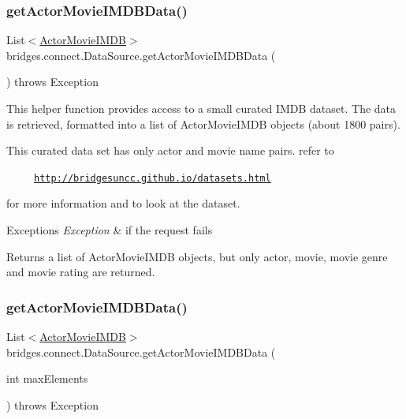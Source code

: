 \subsubsection{\texorpdfstring{get\+Actor\+Movie\+I\+M\+D\+B\+Data()}{getActorMovieIMDBData()}\hspace{0.1cm}{\footnotesize\ttfamily [1/2]}}
{\footnotesize\ttfamily List$<$\hyperlink{classbridges_1_1data__src__dependent_1_1_actor_movie_i_m_d_b}{Actor\+Movie\+I\+M\+DB}$>$ bridges.\+connect.\+Data\+Source.\+get\+Actor\+Movie\+I\+M\+D\+B\+Data (\begin{DoxyParamCaption}{ }\end{DoxyParamCaption}) throws Exception}

This helper function provides access to a small curated I\+M\+DB dataset. The data is retrieved, formatted into a list of Actor\+Movie\+I\+M\+DB objects (about 1800 pairs).

This curated data set has only actor and movie name pairs. refer to 

~~~~~\href{http://bridgesuncc.github.io/datasets.html}{\tt http\+://bridgesuncc.\+github.\+io/datasets.\+html} 

for more information and to look at the dataset.


\begin{DoxyExceptions}{Exceptions}
{\em Exception} & if the request fails\\
\hline
\end{DoxyExceptions}
\begin{DoxyReturn}{Returns}
a list of Actor\+Movie\+I\+M\+DB objects, but only actor, movie, movie genre and movie rating are returned. 
\end{DoxyReturn}
\mbox{\label{classbridges_1_1connect_1_1_data_source_a3b3c231fee0ce328fb8f79807742aecd}} 
\subsubsection{\texorpdfstring{get\+Actor\+Movie\+I\+M\+D\+B\+Data()}{getActorMovieIMDBData()}\hspace{0.1cm}{\footnotesize\ttfamily [2/2]}}
{\footnotesize\ttfamily List$<$\hyperlink{classbridges_1_1data__src__dependent_1_1_actor_movie_i_m_d_b}{Actor\+Movie\+I\+M\+DB}$>$ bridges.\+connect.\+Data\+Source.\+get\+Actor\+Movie\+I\+M\+D\+B\+Data (\begin{DoxyParamCaption}\item[{int}]{max\+Elements }\end{DoxyParamCaption}) throws Exception}

